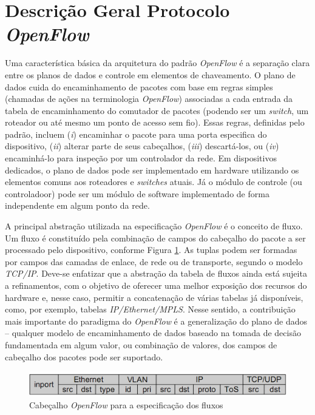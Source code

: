 \section{Descrição Geral Protocolo \textit{OpenFlow}}

Uma característica básica da arquitetura do padrão \textit{OpenFlow} 
é a separação clara entre os planos de dados e controle em
elementos de chaveamento. O plano de dados cuida do 
encaminhamento de pacotes com base em regras simples (chamadas de ações 
na terminologia \textit{OpenFlow}) associadas
a cada entrada da tabela de encaminhamento do comutador 
de pacotes (podendo ser um \textit{switch}, um roteador 
ou até mesmo um ponto de acesso sem fio).
Essas regras, definidas pelo padrão, incluem (\textit{i}) 
encaminhar o pacote para uma porta especifica do dispositivo,
(\textit{ii}) alterar parte de seus cabeçalhos, (\textit{iii}) 
descartá-los, ou (\textit{iv}) encaminhá-lo para inspeção 
por um controlador da rede. Em dispositivos dedicados, o plano
de dados pode ser implementado em hardware utilizando os
elementos comuns aos roteadores e \textit{switches} atuais.
Já o módulo de controle (ou controladoor) pode ser um 
módulo de software implementado de forma independente em
algum ponto da rede.

A principal abstração utilizada na especificação
\textit{OpenFlow} é o conceito
de fluxo. Um fluxo é constituído pela combinação de campos
do cabeçalho do pacote a ser processado pelo dispositivo,
conforme Figura \ref{fig:cabecalhoOpenflow}. As tuplas podem
ser formadas por campos das camadas de enlace, de rede ou de
transporte, segundo o modelo \textit{TCP/IP}. Deve-se
enfatizar que a abstração da tabela de fluxos ainda está sujeita a
refinamentos, com o objetivo de oferecer uma melhor
exposição dos recursos do hardware e, nesse caso, permitir a
concatenação de várias tabelas já disponíveis, como, por
exemplo, tabelas \textit{IP/Ethernet/MPLS}. Nesse sentido, a
contribuição mais importante do paradigma do
\textit{OpenFlow} é a generalização do plano
de dados – qualquer modelo de encaminhamento de dados
baseado na tomada de decisão fundamentada em algum valor, ou
combinação de valores, dos campos de cabeçalho dos pacotes
pode ser suportado.

\begin{figure}[hb] \centering
\includegraphics[width=160mm]{cabecalhoOpenflow.png}
\caption{Cabeçalho \textit{OpenFlow} para a especificação dos fluxos}
\label{fig:cabecalhoOpenflow}
\end{figure}

